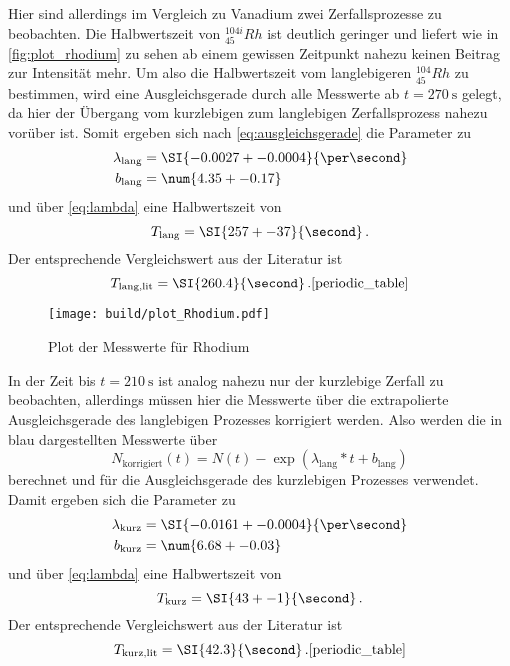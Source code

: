 Hier sind allerdings im Vergleich zu Vanadium zwei Zerfallsprozesse zu beobachten. 
Die Halbwertszeit von $ ^{104i}_{45}Rh$ ist deutlich geringer und liefert wie in \autoref{fig:plot_rhodium} zu sehen ab einem gewissen Zeitpunkt nahezu keinen Beitrag zur Intensität mehr.
Um also die Halbwertszeit vom langlebigeren $ ^{104}_{45}Rh$ zu bestimmen, wird eine Ausgleichsgerade durch alle Messwerte ab $t=\SI{270}{\second}$ gelegt, da hier der Übergang vom kurzlebigen zum langlebigen Zerfallsprozess nahezu vorüber ist.
Somit ergeben sich nach \autoref{eq:ausgleichsgerade} die Parameter zu 
\begin{align*}
    \lambda_\text{lang} &= \SI{-0.0027+-0.0004}{\per\second} \\
    b_\text{lang} &= \num{4.35+-0.17}
\end{align*}
und über \autoref{eq:lambda} eine Halbwertszeit von 
\begin{equation*}
    T_\text{lang} = \SI{257+-37}{\second} \, .
\end{equation*}
Der entsprechende Vergleichswert aus der Literatur ist 
\begin{equation*}
    T_\text{lang,lit} = \SI{260.4}{\second} \, .\text{\cite{periodic_table}}
\end{equation*}

\begin{figure}
    \centering
    \texttt{[image: build/plot\_Rhodium.pdf]}
    \caption{Plot der Messwerte für Rhodium}
    \label{fig:plot_rhodium}
\end{figure}

In der Zeit bis $t=\SI{210}{\second}$ ist analog nahezu nur der kurzlebige Zerfall zu beobachten, allerdings müssen hier die Messwerte über die extrapolierte Ausgleichsgerade des langlebigen Prozesses korrigiert werden.
Also werden die in blau dargestellten Messwerte über
\begin{equation}
    N_\text{korrigiert}(t) = N(t) - \exp(\lambda_\text{lang} * t + b_\text{lang})
\end{equation}
berechnet und für die Ausgleichsgerade des kurzlebigen Prozesses verwendet.
Damit ergeben sich die Parameter zu
\begin{align*}
    \lambda_\text{kurz} &= \SI{-0.0161+-0.0004}{\per\second} \\
    b_\text{kurz} &= \num{6.68+-0.03}
\end{align*}
und über \autoref{eq:lambda} eine Halbwertszeit von 
\begin{equation*}
    T_\text{kurz} = \SI{43+-1}{\second} \, .
\end{equation*}
Der entsprechende Vergleichswert aus der Literatur ist 
\begin{equation*}
    T_\text{kurz,lit} = \SI{42.3}{\second} \, .\text{\cite{periodic_table}}
\end{equation*}